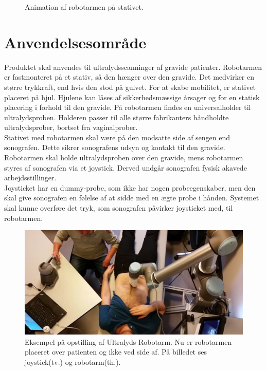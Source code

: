 \begin{figure}[H]
\begin{minipage}{0.55\textwidth}
		\caption{Animation af robotarmen på stativet.}
		\label{Robotstativ}
	\end{minipage}
\end{figure}

\section{Anvendelsesområde}
Produktet skal anvendes til ultralydsscanninger af gravide patienter. Robotarmen er fastmonteret på et stativ, så den hænger over den gravide. Det medvirker en større trykkraft, end hvis den stod på gulvet. For at skabe mobilitet, er stativet placeret på hjul. Hjulene kan låses af sikkerhedsmæssige årsager og for en statisk placering i forhold til den gravide. På robotarmen findes en universalholder til ultralydsproben. Holderen passer til alle større fabrikanters håndholdte ultralydsprober, bortset fra vaginalprober.\\

Stativet med robotarmen skal være på den modsatte side af sengen end sonografen. Dette sikrer sonografens udsyn og kontakt til den gravide.
Robotarmen skal holde ultralydsproben over den gravide, mens robotarmen styres af sonografen via et joystick. Derved undgår sonografen fysisk akavede arbejdsstillinger. \\
Joysticket har en dummy-probe, som ikke har nogen probeegenskaber, men den skal give sonografen en følelse af at sidde med en ægte probe i hånden.
Systemet skal kunne overføre det tryk, som sonografen påvirker joysticket med, til robotarmen.

\begin{figure}[H]\centering
	\includegraphics[width = 1.0\textwidth]{Figurer/ergonomiskLosning.jpg}
	\caption{Eksempel på opstilling af Ultralyds Robotarm. Nu er robotarmen placeret over patienten og ikke ved side af. På billedet ses joystick(tv.) og robotarm(th.).  }
	\label{ergonomiskLosning}
\end{figure}

